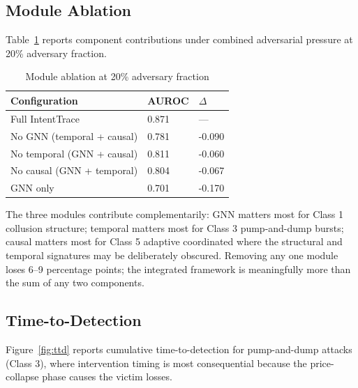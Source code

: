 \documentclass[sigconf,nonacm]{acmart}
\begin{document}
\subsection{Module Ablation}

Table~\ref{tab:ablation} reports component contributions under
combined adversarial pressure at 20\% adversary fraction.

\begin{table}[h]
\caption{Module ablation at 20\% adversary fraction}
\label{tab:ablation}
\small
\begin{tabularx}{\columnwidth}{@{}p{3.0cm}X X@{}}
\toprule
\textbf{Configuration} & \textbf{AUROC} & \textbf{$\Delta$} \\
\midrule
Full IntentTrace          & 0.871 & --- \\
No GNN (temporal + causal) & 0.781 & -0.090 \\
No temporal (GNN + causal) & 0.811 & -0.060 \\
No causal (GNN + temporal) & 0.804 & -0.067 \\
GNN only                   & 0.701 & -0.170 \\
\bottomrule
\end{tabularx}
\end{table}

The three modules contribute complementarily: GNN matters most
for Class 1 collusion structure; temporal matters most for Class 3
pump-and-dump bursts; causal matters most for Class 5 adaptive
coordinated where the structural and temporal signatures may be
deliberately obscured. Removing any one module loses 6--9
percentage points; the integrated framework is meaningfully more
than the sum of any two components.

\subsection{Time-to-Detection}

Figure~\ref{fig:ttd} reports cumulative time-to-detection for
pump-and-dump attacks (Class 3), where intervention timing is
most consequential because the price-collapse phase causes the
victim losses.
\end{document}

